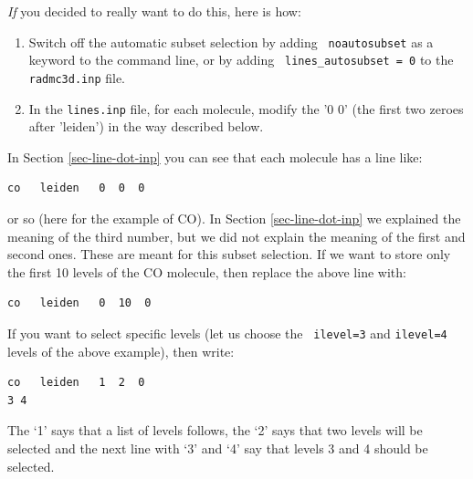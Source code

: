 \documentclass{report}
\newenvironment{asciibox}%
  {\begin{list}{}{%
    \setlength{\topsep}{0.5em}%
    \setlength{\parskip}{0em}%
    \setlength{\parsep}{0em}%
    \setlength{\itemsep}{0em}%
    \setlength{\rightmargin}{0em}%
    \setlength{\leftmargin}{3.0em}%
    \setlength{\labelsep}{1em}%
    \setlength{\labelwidth}{2em}%
  }\normalfont\footnotesize\item}
  {\end{list}}
\begin{document}
{\em If} you decided to really want to do this, here is how:
\begin{enumerate}
\item Switch off the automatic subset selection by adding {\small\tt
    noautosubset} as a keyword to the command line, or by adding {\small\tt
    lines\_autosubset = 0} to the {\small\tt radmc3d.inp} file.
\item In the {\small\tt lines.inp} file, for each molecule, modify the
  '0 0' (the first two zeroes after 'leiden') in the way described below.
\end{enumerate}

In Section \ref{sec-line-dot-inp} you can see that each molecule has a line
like:
\begin{asciibox}\begin{verbatim}
co   leiden   0  0  0
\end{verbatim}\end{asciibox}
or so (here for the example of CO). In Section \ref{sec-line-dot-inp} we
explained the meaning of the third number, but we did not explain the
meaning of the first and second ones. These are meant for this subset
selection. If we want to store only the first 10 levels of the CO 
molecule, then replace the above line with:
\begin{asciibox}\begin{verbatim}
co   leiden   0  10  0
\end{verbatim}\end{asciibox}
If you want to select specific levels (let us choose the {\small\tt
  ilevel=3} and {\small\tt ilevel=4} levels of the above example),
then write:
\begin{asciibox}\begin{verbatim}
co   leiden   1  2  0
3 4
\end{verbatim}\end{asciibox}
The `1' says that a list of levels follows, the `2' says that two levels
will be selected and the next line with `3' and `4' say that levels 3
and 4 should be selected. 




\end{document}
